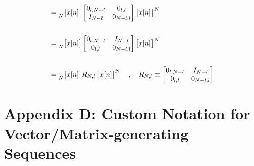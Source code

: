 \documentclass{article}
\begin{document}
\begin{align*}
             &=\prescript{}{N}{\begin{bmatrix} x[n] \end{bmatrix}}\begin{bmatrix}
                                                                        0_{l, N - l} & 0_{    l, l} \\
                                                                        I_{   N - l} & 0_{N - l, l}
                                                                    \end{bmatrix}\begin{bmatrix} x[n] \end{bmatrix}^{N} \\ \\
             &=\prescript{}{N}{\begin{bmatrix} x[n] \end{bmatrix}}\begin{bmatrix}
                                                                        0_{l, N - l} & I_{N - l} \\
                                                                        0_{l,     l} & 0_{N - l, l}
                                                                    \end{bmatrix}\begin{bmatrix} x[n] \end{bmatrix}^{N} \\ \\
             &=\prescript{}{N}{\begin{bmatrix} x[n] \end{bmatrix}}R_{N, l}\begin{bmatrix} x[n] \end{bmatrix}^{N} \quad, \quad R_{N, l} \equiv \begin{bmatrix}
                                                                                                                                                    0_{l, N - l} & I_{N - l} \\
                                                                                                                                                    0_{l,     l} & 0_{N - l, l}
                                                                                                                                                \end{bmatrix}
  \end{align*}

\newpage
\section*{Appendix D: Custom Notation for Vector/Matrix-generating Sequences}
\end{document}
